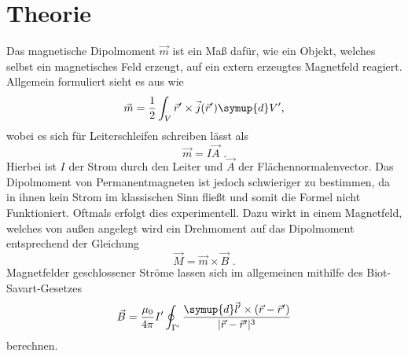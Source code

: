 \section{Theorie}
\label{sec:Theorie}

Das magnetische Dipolmoment $\vec{m}$ ist ein Maß dafür, wie ein Objekt, welches selbst ein magnetisches Feld erzeugt, auf ein extern erzeugtes
Magnetfeld reagiert. Allgemein formuliert sieht es aus wie
\begin{equation}
    \vec{m}=\frac{1}{2}\int_{V}\vec{r}'\times\vec{j}(\vec{r}')\symup{d}V' \text{,}
\end{equation}
wobei es sich für Leiterschleifen schreiben lässt als
\begin{equation}
    \vec{m}=I\vec{A}\text{ .}
\end{equation}
Hierbei ist $I$ der Strom durch den Leiter und $\vec{A}$ der Flächennormalenvector. 
Das Dipolmoment von Permanentmagneten ist jedoch schwieriger zu bestimmen, da in ihnen kein Strom im klassischen Sinn fließt und
somit die Formel nicht Funktioniert. Oftmals erfolgt dies experimentell.
Dazu wirkt in einem Magnetfeld,
welches von außen angelegt wird ein Drehmoment auf das Dipolmoment entsprechend der Gleichung
\begin{equation}
    \vec{M}=\vec{m}\times\vec{B}\text{ .}
    \label{eqn:MagDreh}
\end{equation}
Magnetfelder geschlossener Ströme lassen sich im allgemeinen mithilfe des Biot-Savart-Gesetzes
\begin{equation}
    \vec{B}=\frac{\mu_0}{4\pi}I'\oint_{\Gamma'}\frac{\symup{d}\vec{l}'\times(\vec{r}-\vec{r}')}{|\vec{r}-\vec{r}'|^3}
    \label{eqn:Biot}
\end{equation} 
berechnen. \\

